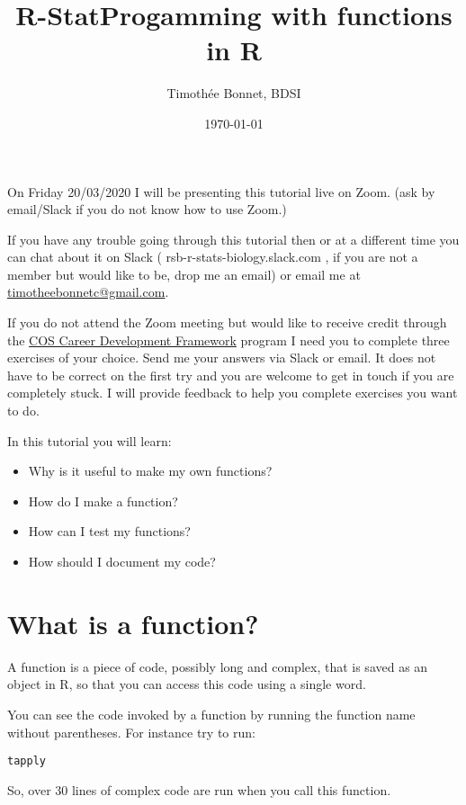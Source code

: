 \documentclass[12pt,a4paper]{scrartcl}\usepackage[]{graphicx}\usepackage[]{color}
\title{R-StatProgamming with functions in R}
\date{\today}
\author{Timoth\'ee Bonnet, BDSI}
\makeatletter
\newcommand{\hlstd}[1]{\textcolor[rgb]{0.345,0.345,0.345}{#1}}%
\newenvironment{kframe}{%
 \def\at@end@of@kframe{}%
 \ifinner\ifhmode%
  \def\at@end@of@kframe{\end{minipage}}%
  \begin{minipage}{\columnwidth}%
 \fi\fi%
 \def\FrameCommand##1{\hskip\@totalleftmargin \hskip-\fboxsep
 \colorbox{shadecolor}{##1}\hskip-\fboxsep
     \hskip-\linewidth \hskip-\@totalleftmargin \hskip\columnwidth}%
 \MakeFramed {\advance\hsize-\width
   \@totalleftmargin\z@ \linewidth\hsize
   \@setminipage}}%
 {\par\unskip\endMakeFramed%
 \at@end@of@kframe}
\newenvironment{knitrout}{}{} %
\makeatother
\begin{document}
\maketitle

On Friday 20/03/2020 I will be presenting this tutorial live on Zoom. (ask by email/Slack if you do not know how to use Zoom.)

If you have any trouble going through this tutorial then or at a different time you can chat about it on Slack ( rsb-r-stats-biology.slack.com , if you are not a member but would like to be, drop me an email) or email me at \href{mailto:timotheebonnetc@gmail.com}{timotheebonnetc@gmail.com}.

If you do not attend the Zoom meeting but would like to receive credit through the \href{https://wattlecourses.anu.edu.au/enrol/index.php?id=23938}{COS Career Development Framework} program I need you to complete three exercises of your choice. Send me your answers via Slack or email. It does not have to be correct on the first try and you are welcome to get in touch if you are completely stuck. I will provide feedback to help you complete exercises you want to do.

In this tutorial you will learn:

\begin{itemize}
    \item Why is it useful to make my own functions?
    \item How do I make a function?
    \item How can I test my functions?
    \item How should I document my code?
\end{itemize}

\tableofcontents
\ListOfExerciseInToc
{}

\clearpage



\section{What is a function?}

A function is a piece of code, possibly long and complex, that is saved as an object in R, so that you can access this code using a single word.

You can see the code invoked by a function by running the function name without parentheses. For instance try to run:
\begin{knitrout}
\color{fgcolor}\begin{kframe}
\begin{alltt}
\hlstd{tapply}
\end{alltt}
\end{kframe}
\end{knitrout}
So, over 30 lines of complex code are run when you call this function.
\end{document}
